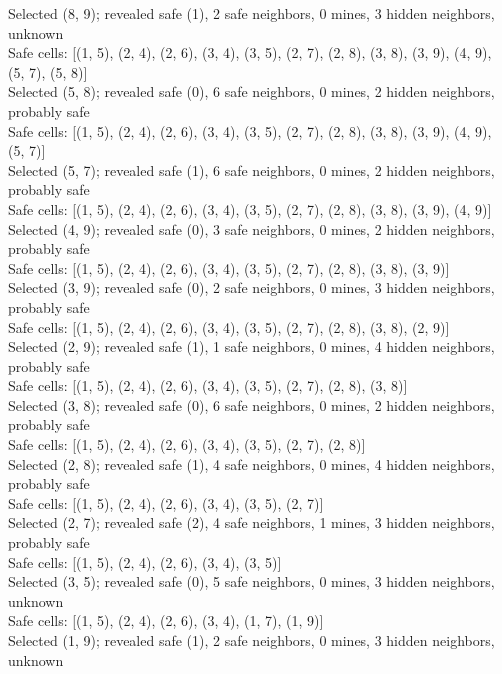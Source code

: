 \documentclass[11pt]{article} %
\begin{document}
Selected (8, 9); revealed safe (1), 2 safe neighbors, 0 mines, 3 hidden neighbors, unknown\\
Safe cells: [(1, 5), (2, 4), (2, 6), (3, 4), (3, 5), (2, 7), (2, 8), (3, 8), (3, 9), (4, 9), (5, 7), (5, 8)]\\
Selected (5, 8); revealed safe (0), 6 safe neighbors, 0 mines, 2 hidden neighbors, probably safe\\
Safe cells: [(1, 5), (2, 4), (2, 6), (3, 4), (3, 5), (2, 7), (2, 8), (3, 8), (3, 9), (4, 9), (5, 7)]\\
Selected (5, 7); revealed safe (1), 6 safe neighbors, 0 mines, 2 hidden neighbors, probably safe\\
Safe cells: [(1, 5), (2, 4), (2, 6), (3, 4), (3, 5), (2, 7), (2, 8), (3, 8), (3, 9), (4, 9)]\\
Selected (4, 9); revealed safe (0), 3 safe neighbors, 0 mines, 2 hidden neighbors, probably safe\\
Safe cells: [(1, 5), (2, 4), (2, 6), (3, 4), (3, 5), (2, 7), (2, 8), (3, 8), (3, 9)]\\
Selected (3, 9); revealed safe (0), 2 safe neighbors, 0 mines, 3 hidden neighbors, probably safe\\
Safe cells: [(1, 5), (2, 4), (2, 6), (3, 4), (3, 5), (2, 7), (2, 8), (3, 8), (2, 9)]\\
Selected (2, 9); revealed safe (1), 1 safe neighbors, 0 mines, 4 hidden neighbors, probably safe\\
Safe cells: [(1, 5), (2, 4), (2, 6), (3, 4), (3, 5), (2, 7), (2, 8), (3, 8)]\\
Selected (3, 8); revealed safe (0), 6 safe neighbors, 0 mines, 2 hidden neighbors, probably safe\\
Safe cells: [(1, 5), (2, 4), (2, 6), (3, 4), (3, 5), (2, 7), (2, 8)]\\
Selected (2, 8); revealed safe (1), 4 safe neighbors, 0 mines, 4 hidden neighbors, probably safe\\
Safe cells: [(1, 5), (2, 4), (2, 6), (3, 4), (3, 5), (2, 7)]\\
Selected (2, 7); revealed safe (2), 4 safe neighbors, 1 mines, 3 hidden neighbors, probably safe\\
Safe cells: [(1, 5), (2, 4), (2, 6), (3, 4), (3, 5)]\\
Selected (3, 5); revealed safe (0), 5 safe neighbors, 0 mines, 3 hidden neighbors, unknown\\
Safe cells: [(1, 5), (2, 4), (2, 6), (3, 4), (1, 7), (1, 9)]\\
Selected (1, 9); revealed safe (1), 2 safe neighbors, 0 mines, 3 hidden neighbors, unknown\\
\end{document}
